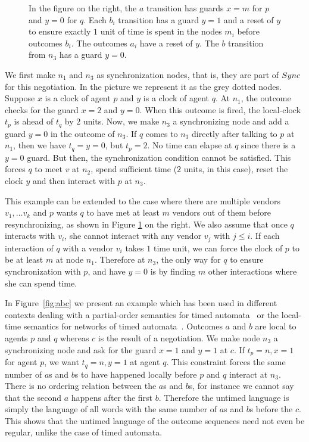 \begin{figure}[t]
\begin{tikzpicture}[scale=0.65, every node/.style={transform shape}]
\end{tikzpicture}
\caption{In the figure on the right,
          the $a$ transition has guards $x = m$ for $p$ and $y = 0$
          for $q$. Each $b_i$ transition has a guard $y=1$ and a reset
          of $y$ to ensure exactly $1$ unit of time is spent in the
          nodes $m_i$ before outcomes $b_i$. The outcomes $a_i$ have a
          reset of $y$. The $b$ transition from
          $n_3$ has a guard $y=0$. }   
	\label{fig:k-vendor}
\end{figure}

We first make $n_1$ and $n_3$ as synchronization nodes, that is, they
are part of $\Sync$ for this negotiation. In the picture we represent
it as the grey dotted nodes. Suppose $x$ is a clock of agent $p$ and $y$ is a clock of
agent $q$. At
$n_1$, the outcome checks for the guard $x = 2$ and $y = 0$. When this
outcome is fired, the local-clock $t_p$ is ahead of $t_q$ by $2$
units. Now, we make $n_3$ a synchronizing node and add a guard $y = 0$
in the outcome of $n_3$. If $q$ comes to $n_3$ directly after talking
to $p$ at $n_1$, then we have $t_q = y = 0$, but $t_p = 2$. No time
can elapse at $q$ since there is a $y = 0$ guard. But then, the
synchronization condition cannot be satisfied. This forces $q$ to meet
$v$ at $n_2$, spend sufficient time ($2$ units, in this case), reset
the clock $y$ and then interact with $p$ at $n_3$.

This example can be extended to the case where there are multiple
vendors $v_1, \dots v_k$ and $p$ wants $q$ to have met at least $m$
vendors out of them before resynchronizing, as shown in Figure
\ref{fig:k-vendor} on the right. We also assume that once
$q$ interacts with $v_i$, she cannot interact with any vendor $v_j$
with $j \le i$. If each interaction of $q$ with a vendor $v_i$ takes
$1$ time unit, we can force the clock of $p$ to be at least $m$ at
node $n_1$. Therefore at $n_3$, the only way for $q$ to ensure
synchronization with $p$, and have $y = 0$ is by finding $m$ other
interactions where she can spend time.

In Figure~\ref{fig:abc} we present an example which has been used in
different contexts dealing with a partial-order semantics for timed
automata~\cite{DBLP:journals/tcs/LugiezNZ05} or the local-time semantics for networks of timed
automata~\cite{DBLP:conf/lics/0001HSW22}.  
Outcomes $a$ and $b$ are local to agents $p$ and $q$ whereas
$c$ is the result of a negotiation. 
We make node $n_3$ a synchronizing
node and ask for the guard $x = 1$ and $y = 1$ at $c$. If $t_p = n, x
= 1$ for agent $p$, we want $t_q = n, y = 1$ at agent $q$. This
constraint forces the same number of $a$s and $b$s to have happened
locally before $p$ and $q$ interact at $n_3$. There is no ordering
relation between the $a$s and $b$s, for instance we cannot say 
that the
second $a$ happens after the first $b$. Therefore the untimed language
is simply the language of all words with the same number of $a$s and
$b$s before the $c$. This shows that the
untimed language of the outcome sequences need not even be regular,
unlike the case of timed automata.

